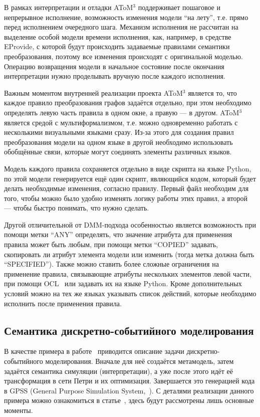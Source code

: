\documentclass[a5paper]{article}
\begin{document}
В рамках интерпретации и отладки AToM$^3$ поддерживает пошаговое и непрерывное исполнение, возможность изменения модели “на лету”, т.е. прямо перед исполнением очередного шага. Механизм исполнения не рассчитан на выделение особой модели времени исполнения, как, например, в средстве EProvide, с которой будут происходить задаваемые правилами семантики преобразования, поэтому все изменения происходят с оригинальной моделью. Операцию возвращения модели в начальное состояние после окончания интерпретации нужно проделывать вручную после каждого исполнения.

Важным моментом внутренней реализации проекта AToM$^3$ является то, что каждое правило преобразования графов задаётся отдельно, при этом необходимо определять левую часть правила в одном окне, а правую --- в другом. AToM$^3$ является средой с мультиформализмом, т.е. можно одновременно работать с несколькими визуальными языками сразу. Из-за этого для создания правил преобразования модели на одном языке в другой необходимо использовать обобщённые связи, которые могут соединять элементы различных языков.

Модель каждого правила сохраняется отдельно в виде скрипта на языке Python, по этой модели генерируется ещё один скрипт, являющийся кодом, который будет делать необходимые изменения, согласно правилу. Первый файл необходим для того, чтобы можно было удобно изменять логику работы этих правил, а второй --- чтобы быстро понимать, что нужно сделать.

Другой отличительной от DMM-подхода особенностью является возможность при помощи метки “ANY” определять, что значение атрибута для применения правила может быть любым, при помощи метки “COPIED” задавать, скопировать ли атрибут элемента модели или изменить (тогда метка должна быть “SPECIFIED”). Также можно ставить более сложные ограничения на применение правила, связывающие атрибуты нескольких элементов левой части, при помощи OCL~\cite{ocl} или задавать их на языке Python. Кроме дополнительных условий можно на тех же языках указывать список действий, которые необходимо исполнить после применения правила.

\subsection{Семантика дискретно-событийного моделирования}

В качестве примера в работе~\cite{atom1} приводится описание задачи дискретно-событийного моделирования. Вначале для неё создаётся метамодель, затем задаётся семантика симуляции (интерпретации), а уже после этого идёт её трансформация в сети Петри и их оптимизация. Завершается это генерацией кода в GPSS (General Purpose Simulation System,~\cite{gpss}). С деталями реализации данного примера можно ознакомиться в статье~\cite{atom3}, здесь будут рассмотрены лишь основные моменты.
\end{document}
